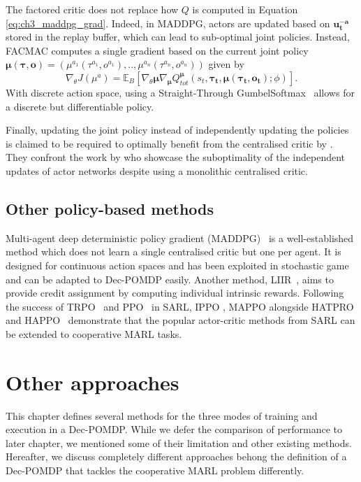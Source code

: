 The factored critic does not replace how $Q$ is computed in Equation \ref{eq:ch3_maddpg_grad}.
Indeed, in MADDPG, actors are updated based on $\mathbf{u_t^{-a}}$ stored in the replay buffer, which can lead to sub-optimal joint policies.
Instead, FACMAC computes a single gradient based on the current joint policy $\mathbf{\mu}(\mathbf{\tau}, \mathbf{o}) = (\mu^{a_1}(\tau^{a_1}, o^{a_1}), .., \mu^{a_n}(\tau^{a_n}, o^{a_n}))$ given by
\begin{equation}
\label{eq:ch3_facmac_grad}
    \nabla_\theta J(\mu^a) = \mathbb{E}_B\left[\nabla_{\theta} \mathbf{\mu} \nabla_{\mathbf{\mu}} Q_{tot}^{\mathbf{\mu}}(s_t, \mathbf{\tau_t}, \mathbf{\mu}(\mathbf{\tau_t}, \mathbf{o_t}); \phi)\right].
\end{equation}
With discrete action space, using a Straight-Through GumbelSoftmax~\citep{jang2017categorical} allows for a discrete but differentiable policy.

Finally, updating the joint policy instead of independently updating the policies is claimed to be required to optimally benefit from the centralised critic by \cite{peng2021facmac}.
They confront the work by \cite{lyu2021contrasting} who showcase the suboptimality of the independent updates of actor networks despite using a monolithic centralised critic.

\subsection{Other policy-based methods}

Multi-agent deep deterministic policy gradient (MADDPG)~\citep{lowe2017multi} is a well-established method which does not learn a single centralised critic but one per agent.
It is designed for continuous action spaces and has been exploited in stochastic game and can be adapted to Dec-POMDP easily.
Another method, LIIR~\citep{Du2019LIIRLearning}, aims to provide credit assignment by computing individual intrinsic rewards.
Following the success of TRPO~\citep{schulman2015trust} and PPO~\citep{schulman2017ppo} in SARL, IPPO \citep{de2020independent}, MAPPO \citep{yu2022surprising} alongside HATPRO and HAPPO~\citep{kuba2021trust} demonstrate that the popular actor-critic methods from SARL can be extended to cooperative MARL tasks.

\section{Other approaches}
\label{sec:ch3_further}
This chapter defines several methods for the three modes of training and execution in a Dec-POMDP.
While we defer the comparison of performance to later chapter, we mentioned some of their limitation and other existing methods.
Hereafter, we discuss completely different approaches behong the definition of a Dec-POMDP that tackles the cooperative MARL problem differently.

